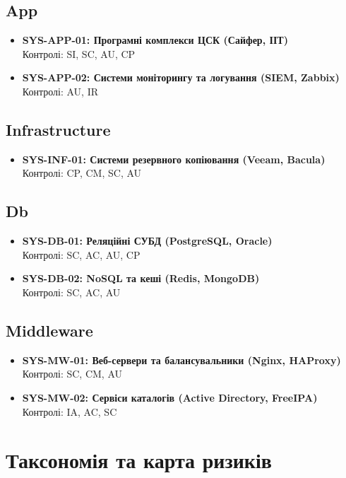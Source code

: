 \documentclass{article}
\begin{document}
\subsection{App}
\begin{itemize}
\item \textbf{SYS-APP-01: Програмні комплекси ЦСК (Сайфер, ІІТ)}
\\ Контролі: SI, SC, AU, CP
\item \textbf{SYS-APP-02: Системи моніторингу та логування (SIEM, Zabbix)}
\\ Контролі: AU, IR
\end{itemize}
\subsection{Infrastructure}
\begin{itemize}
\item \textbf{SYS-INF-01: Системи резервного копіювання (Veeam, Bacula)}
\\ Контролі: CP, CM, SC, AU
\end{itemize}
\subsection{Db}
\begin{itemize}
\item \textbf{SYS-DB-01: Реляційні СУБД (PostgreSQL, Oracle)}
\\ Контролі: SC, AC, AU, CP
\item \textbf{SYS-DB-02: NoSQL та кеші (Redis, MongoDB)}
\\ Контролі: SC, AC, AU
\end{itemize}
\subsection{Middleware}
\begin{itemize}
\item \textbf{SYS-MW-01: Веб-сервери та балансувальники (Nginx, HAProxy)}
\\ Контролі: SC, CM, AU
\item \textbf{SYS-MW-02: Сервіси каталогів (Active Directory, FreeIPA)}
\\ Контролі: IA, AC, SC
\end{itemize}


\newpage
\section{Таксономія та карта ризиків}
\end{document}
